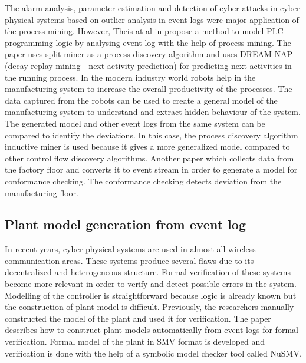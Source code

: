 \begin{bibunit}
   The alarm analysis, parameter estimation and detection of cyber-attacks in cyber physical systems based on outlier analysis in event logs were major application of the process mining. However,  Theis at al in \cite{paper6} propose a method to model PLC programming logic by analysing event log with the help of process mining. The paper uses split miner as a process discovery algorithm and uses DREAM-NAP (decay replay mining - next activity prediction) for predicting next activities in the running process. In the modern industry world robots help in the manufacturing system to increase the overall productivity of the processes. The data captured from the robots can be used to create a general model of the manufacturing system to understand and extract hidden behaviour of the system. The generated model and other event logs from the same system can be compared to identify the deviations. In this case, the process discovery algorithm inductive miner is used because it gives a more generalized model compared to other control flow discovery algorithms. Another paper \cite{paper8} which collects data from the factory floor and converts it to event stream in order to generate a model for conformance checking. The conformance checking detects deviation from the manufacturing floor.
   
   \subsection{Plant model generation from event log}
   
   In recent years, cyber physical systems are used in almost all wireless communication areas. These systems produce several flaws due to its decentralized and heterogeneous structure. Formal verification of these systems become more relevant in order to verify and detect possible errors in the system. Modelling of the controller is straightforward because logic is already known but the construction of plant model is difficult. Previously, the researchers manually constructed the model of the plant and used it for verification. The paper \cite{etfapaper} describes how to construct plant models automatically from event logs for formal verification. Formal model of the plant in SMV format is developed and verification is done with the help of a symbolic model checker tool called NuSMV.
   
   

\end{bibunit}
